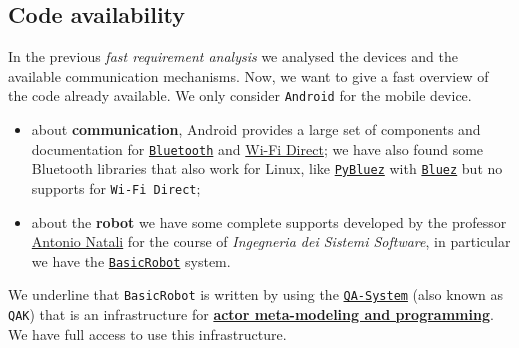 \subsection{Code availability}

In the previous \textit{fast requirement analysis} we analysed the devices and the available communication mechanisms. Now, we want to give a fast overview of the code already available.
We only consider \texttt{Android} for the mobile device.

\begin{itemize}
	\item about \textbf{communication}, Android provides a large set of components and documentation for \href{https://developer.android.com/guide/topics/connectivity/bluetooth}{\texttt{Bluetooth}} and \href{https://developer.android.com/guide/topics/connectivity/wifip2p}{Wi-Fi Direct}; we have also found some Bluetooth libraries that also work for Linux, like \href{https://pybluez.readthedocs.io/en/latest/index.html}{\texttt{PyBluez}} with \href{URLhttp://www.bluez.org/}{\texttt{Bluez}} but no supports for \texttt{Wi-Fi Direct};
	
	\item about the \textbf{robot} we have some complete supports developed by the professor \href{https://www.unibo.it/sitoweb/antonio.natali}{Antonio Natali} for the course of \textit{Ingegneria dei Sistemi Software}, in particular we have the \href{https://htmlpreview.github.io/?https://github.com/anatali/issLab2022/blob/main/it.unibo.issLabStart/userDocs/Dispense/lezioni/html/BasicRobot22.html}{\texttt{BasicRobot}} system.
\end{itemize}

We underline that \texttt{BasicRobot} is written by using the \href{https://htmlpreview.github.io/?https://github.com/anatali/issLab2022/blob/main/it.unibo.issLabStart/userDocs/Dispense/lezioni/html/QakIntro.html}{\texttt{QA-System}} (also known as \texttt{QAK}) that is an infrastructure for \href{https://en.wikipedia.org/wiki/Actor_model}{\textbf{actor meta-modeling and programming}}. We have full access to use this infrastructure.




